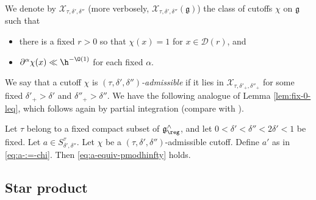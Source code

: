 We denote by $\mathcal{X}_{\tau,\delta ', \delta ''}$ (more verbosely, $\mathcal{X}_{\tau, \delta ', \delta ''}(\mathfrak{g})$) the class of cutoffs $\chi$ on $\mathfrak{g}$ such that
\begin{itemize}
\item there is a fixed $r > 0$ so that $\chi(x) = 1$ for $x \in \mathcal{D}(r)$, and
\item $\partial^{\alpha} \chi(x) \ll \h^{-\O(1)}$ for each fixed $\alpha$.
\end{itemize}
We say that a cutoff $\chi$ is \emph{$(\tau, \delta ', \delta '')$-admissible} if it lies in $\mathcal{X}_{\tau, \delta '_+, \delta ''_+}$ for some fixed $\delta'_+ > \delta '$ and $\delta ''_+ > \delta ''$.  We have the following analogue of Lemma \ref{lem:fix-0-leq}, which follows again by partial integration (compare with \cite[(14.6)]{2020arXiv201202187N}).
\begin{lemma}\label{lem:let-tau-belong}
  Let $\tau$ belong to a fixed compact subset of $\mathfrak{g}^\wedge_{\reg}$, and let $0 < \delta ' < \delta '' < 2 \delta ' < 1$ be fixed.  Let $a \in S^\tau_{\delta ', \delta ''}$.  Let $\chi$ be a $(\tau,\delta ', \delta '')$-admissible cutoff.  Define $a'$ as in \eqref{eq:a-:=-chi}.  Then \eqref{eq:a-equiv-pmodhinfty} holds.
\end{lemma}


\subsection{Star product}\label{sec:star-product}

